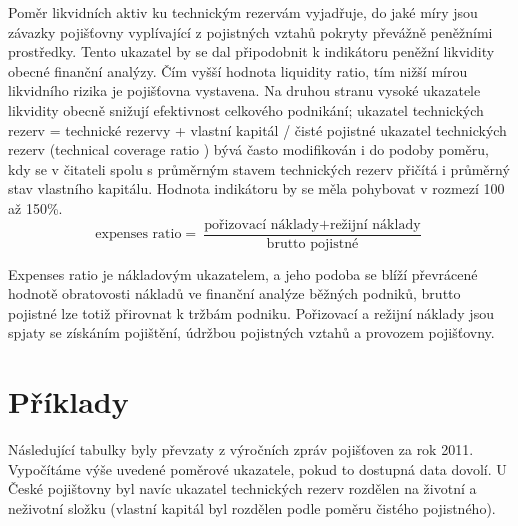 \documentclass[12pt,oneside]{fithesis}
\begin{document}
Poměr likvidních aktiv ku technickým rezervám vyjadřuje, do jaké míry jsou závazky
pojišťovny vyplívající z pojistných vztahů pokryty převážně peněžními prostředky. Tento
ukazatel by se dal připodobnit k indikátoru peněžní likvidity obecné finanční analýzy. Čím
vyšší hodnota liquidity ratio, tím nižší mírou likvidního rizika je pojišťovna vystavena. Na druhou stranu vysoké ukazatele likvidity obecně snižují efektivnost celkového podnikání;
ukazatel technických rezerv = technické rezervy + vlastní kapitál / čisté pojistné
ukazatel technických rezerv (technical coverage ratio ) bývá často modifikován i do podoby
poměru, kdy se v čitateli spolu s průměrným stavem technických rezerv přičítá i průměrný
stav vlastního kapitálu. Hodnota indikátoru by se měla pohybovat v rozmezí 100 až 150\%.
\[
	\text{expenses ratio} =\frac{\text{pořizovací náklady} + \text{režijní náklady}}{\text{brutto pojistné}}
\]

Expenses ratio je nákladovým ukazatelem, a jeho podoba se blíží převrácené hodnotě obratovosti nákladů ve finanční analýze běžných podniků, brutto pojistné lze totiž přirovnat k tržbám podniku. Pořizovací a režijní náklady jsou spjaty se získáním pojištění, údržbou pojistných vztahů a provozem pojišťovny.

\chapter{Příklady}
Následující tabulky byly převzaty z výročních zpráv pojišťoven za rok 2011. Vypočítáme výše uvedené poměrové ukazatele, pokud to dostupná data dovolí. U České pojištovny byl navíc ukazatel technických rezerv rozdělen na životní a neživotní složku (vlastní kapitál byl rozdělen podle poměru čistého pojistného).
\end{document}
